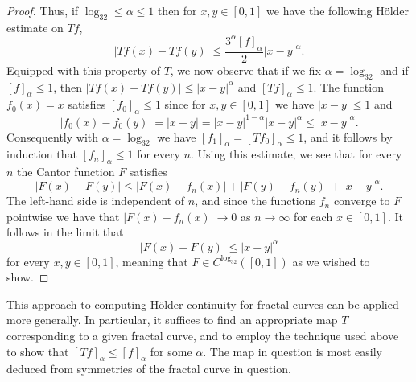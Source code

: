 \documentclass[oneside,hidelinks,indentfirst,10pt]{book}
\begin{document}
\begin{proof}
Thus, if \(\log_32\leq\alpha\leq 1\) then for \(x,y\in[0,1]\) we have the following H\"older estimate on \(Tf\),
\[
    |Tf(x)-Tf(y)|\leq \frac{3^\alpha[f]_\alpha}{2}|x-y|^\alpha.
\]
Equipped with this property of \(T\), we now observe that if we fix \(\alpha=\log_32\) and if \([f]_\alpha\leq1\), then \(|Tf(x)-Tf(y)|\leq |x-y|^\alpha\) and \([Tf]_\alpha\leq 1\). The function \(f_0(x)=x\) satisfies \([f_0]_\alpha\leq 1\) since for \(x,y\in[0,1]\) we have \(|x-y|\leq 1\) and 
\[
    |f_0(x)-f_0(y)|=|x-y|=|x-y|^{1-\alpha}|x-y|^\alpha\leq |x-y|^\alpha.
\]
Consequently with \(\alpha=\log_32\) we have \([f_1]_\alpha=[Tf_0]_\alpha\leq 1\), and it follows by induction that \([f_n]_\alpha\leq 1\) for every \(n\). Using this estimate, we see that for every \(n\) the Cantor function \(F\) satisfies
\[
    |F(x)-F(y)|\leq |F(x)-f_n(x)|+|F(y)-f_n(y)|+|x-y|^\alpha.
\]
The left-hand side is independent of \(n\), and since the functions \(f_n\) converge to \(F\) pointwise we have that \(|F(x)-f_n(x)|\rightarrow0\) as \(n\rightarrow\infty\) for each \(x\in[0,1]\). It follows in the limit that
\[
    |F(x)-F(y)|\leq|x-y|^\alpha
\]
for every \(x,y\in[0,1]\), meaning that \(F\in C^{\log_32}([0,1])\) as we wished to show.
\end{proof}


This approach to computing H\"older continuity for fractal curves can be applied more generally. In particular, it suffices to find an appropriate map \(T\) corresponding to a given fractal curve, and to employ the technique used above to show that \([Tf]_\alpha\leq [f]_\alpha\) for some \(\alpha\). The map in question is most easily deduced from symmetries of the fractal curve in question. 
\end{document}
